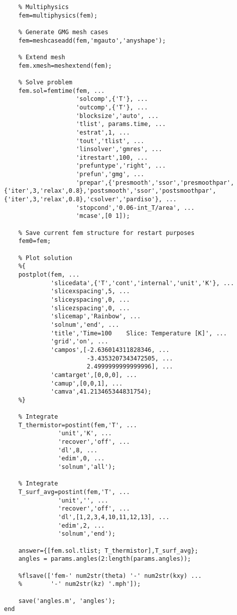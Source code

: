 \begin{verbatim}
    % Multiphysics
    fem=multiphysics(fem);

    % Generate GMG mesh cases
    fem=meshcaseadd(fem,'mgauto','anyshape');

    % Extend mesh
    fem.xmesh=meshextend(fem);

    % Solve problem
    fem.sol=femtime(fem, ...
                    'solcomp',{'T'}, ...
                    'outcomp',{'T'}, ...
                    'blocksize','auto', ...
                    'tlist', params.time, ...
                    'estrat',1, ...
                    'tout','tlist', ...
                    'linsolver','gmres', ...
                    'itrestart',100, ...
                    'prefuntype','right', ...
                    'prefun','gmg', ...
                    'prepar',{'presmooth','ssor','presmoothpar',{'iter',3,'relax',0.8},'postsmooth','ssor','postsmoothpar',{'iter',3,'relax',0.8},'csolver','pardiso'}, ...
                    'stopcond','0.06-int_T/area', ...
                    'mcase',[0 1]);

    % Save current fem structure for restart purposes
    fem0=fem;

    % Plot solution
    %{
    postplot(fem, ...
             'slicedata',{'T','cont','internal','unit','K'}, ...
             'slicexspacing',5, ...
             'sliceyspacing',0, ...
             'slicezspacing',0, ...
             'slicemap','Rainbow', ...
             'solnum','end', ...
             'title','Time=100    Slice: Temperature [K]', ...
             'grid','on', ...
             'campos',[-2.636014311828346, ...
                       -3.4353207343472505, ...
                       2.4999999999999996], ...
             'camtarget',[0,0,0], ...
             'camup',[0,0,1], ...
             'camva',41.213465344831754);
    %}

    % Integrate
    T_thermistor=postint(fem,'T', ...
               'unit','K', ...
               'recover','off', ...
               'dl',8, ...
               'edim',0, ...
               'solnum','all');

    % Integrate
    T_surf_avg=postint(fem,'T', ...
               'unit','', ...
               'recover','off', ...
               'dl',[1,2,3,4,10,11,12,13], ...
               'edim',2, ...
               'solnum','end');

    answer={[fem.sol.tlist; T_thermistor],T_surf_avg};
    angles = params.angles(2:length(params.angles));

    %flsave(['fem-' num2str(theta) '-' num2str(kxy) ...
    %        '-' num2str(kz) '.mph']);

    save('angles.m', 'angles');
end
\end{verbatim}
\normalsize

